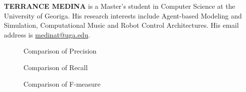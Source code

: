 \documentclass[letterpaper,twocolumn,12pt]{article}
\begin{document}
\vspace{8 pt}
\noindent \textbf{TERRANCE MEDINA} is a Master's student in Computer Science at the University of Georiga.  
His research interests include Agent-based Modeling and Simulation, Computational Music and Robot Control Architectures.
His email address is \href{mailto:medinat@uga.edu}{medinat@uga.edu}.




\onecolumn
\begin{sidewaysfigure}
\centering
\tiny{}
\caption{Comparison of Precision}
\label{fig:precision}
\end{sidewaysfigure}

\begin{sidewaysfigure}
\centering
\tiny{}
\caption{Comparison of Recall}
\label{fig:recall}
\end{sidewaysfigure}

\begin{sidewaysfigure}
\centering
\tiny{}
\caption{Comparison of F-measure}
\label{fig:fmeasure}
\end{sidewaysfigure}
\end{document}
